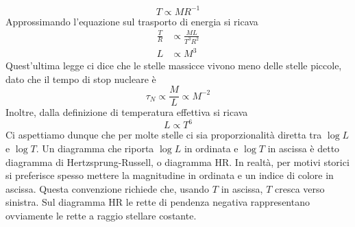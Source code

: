\documentclass[a4paper,11pt]{article}
\theoremstyle{theorem}
\theoremstyle{definition}
\begin{document}
\begin{itemize}
		\[T\propto MR^{-1}\]
		Approssimando l'equazione sul trasporto di energia si ricava
		\begin{align*}
			\frac{T}{R}&\propto \frac{ML}{T^3R^2}\\L&\propto M^3
		\end{align*}
		Quest'ultima legge ci dice che le stelle massicce vivono meno delle stelle piccole, dato che il tempo di stop nucleare è 
		\[\tau_N\propto\frac{M}{L}\propto M^{-2}\]
		Inoltre, dalla definizione di temperatura effettiva si ricava
		\[L\propto T^6\]
		Ci aspettiamo dunque che per molte stelle ci sia proporzionalità diretta tra $\log L$ e $\log T$. Un diagramma che riporta $\log L$ in ordinata e $\log T$ in ascissa è detto diagramma di Hertzsprung-Russell, o diagramma HR. In realtà, per motivi storici si preferisce spesso mettere la magnitudine in ordinata e un indice di colore in ascissa. Questa convenzione richiede che, usando $T$ in ascissa, $T$ cresca verso sinistra. Sul diagramma HR le rette di pendenza negativa rappresentano ovviamente le rette a raggio stellare costante.
		

\end{itemize}
\end{document}
